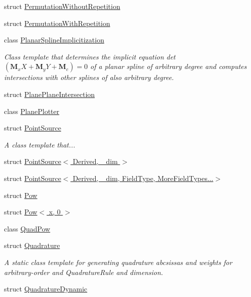\begin{DoxyCompactItemize}
\item 
struct \hyperlink{structmodel_1_1_permutation_without_repetition}{Permutation\+Without\+Repetition}
\item 
struct \hyperlink{structmodel_1_1_permutation_with_repetition}{Permutation\+With\+Repetition}
\item 
class \hyperlink{classmodel_1_1_planar_spline_implicitization}{Planar\+Spline\+Implicitization}
\begin{DoxyCompactList}\small\item\em Class template that determines the implicit equation det $\left(\mathbf{M}_xX+\mathbf{M}_yY+\mathbf{M}_c\right)=0$ of a planar spline of arbitrary degree and computes intersections with other splines of also arbitrary degree. \end{DoxyCompactList}\item 
struct \hyperlink{structmodel_1_1_plane_plane_intersection}{Plane\+Plane\+Intersection}
\item 
class \hyperlink{classmodel_1_1_plane_plotter}{Plane\+Plotter}
\item 
struct \hyperlink{structmodel_1_1_point_source}{Point\+Source}
\begin{DoxyCompactList}\small\item\em A class template that... \end{DoxyCompactList}\item 
struct \hyperlink{structmodel_1_1_point_source_3_01_derived_00_01__dim_01_4}{Point\+Source$<$ Derived, \+\_\+dim $>$}
\item 
struct \hyperlink{structmodel_1_1_point_source_3_01_derived_00_01__dim_00_01_field_type_00_01_more_field_types_8_8_8_4}{Point\+Source$<$ Derived, \+\_\+dim, Field\+Type, More\+Field\+Types...$>$}
\item 
struct \hyperlink{structmodel_1_1_pow}{Pow}
\item 
struct \hyperlink{structmodel_1_1_pow_3_01x_00_010_01_4}{Pow$<$ x, 0 $>$}
\item 
class \hyperlink{classmodel_1_1_quad_pow}{Quad\+Pow}
\item 
struct \hyperlink{structmodel_1_1_quadrature}{Quadrature}
\begin{DoxyCompactList}\small\item\em A static class template for generating quadrature abcsissas and weights for arbitrary-\/order and Quadrature\+Rule and dimension. \end{DoxyCompactList}\item 
struct \hyperlink{structmodel_1_1_quadrature_dynamic}{Quadrature\+Dynamic}

\end{DoxyCompactItemize}
